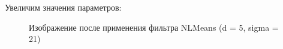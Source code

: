 \documentclass[14pt,a4paper,report]{report}
\begin{document}
Увеличим значения параметров:

\begin{figure}[h]
\begin{minipage}[h]{0.47\linewidth}
\end{minipage}
\hfill
\begin{minipage}[h]{0.47\linewidth}
\end{minipage}
\caption{Изображение после применения фильтра NLMeans (d = 5, sigma = 21)}
\label{ris:image1}
\end{figure}
\end{document}
